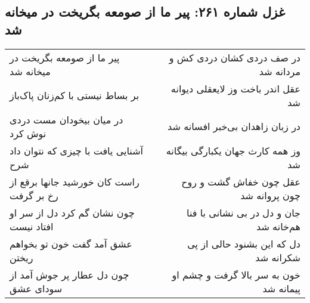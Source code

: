 \begin{center}
\section*{غزل شماره ۲۶۱: پیر ما از صومعه بگریخت در میخانه شد}
\label{sec:261}
\begin{longtable}{l p{0.5cm} r}
پیر ما از صومعه بگریخت در میخانه شد
&&
در صف دردی کشان دردی کش و مردانه شد
\\
بر بساط نیستی با کم‌زنان پاک‌باز
&&
عقل اندر باخت وز لایعقلی دیوانه شد
\\
در میان بیخودان مست دردی نوش کرد
&&
در زبان زاهدان بی‌خبر افسانه شد
\\
آشنایی یافت با چیزی که نتوان داد شرح
&&
وز همه کارث جهان یکبارگی بیگانه شد
\\
راست کان خورشید جانها برقع از رخ بر گرفت
&&
عقل چون خفاش گشت و روح چون پروانه شد
\\
چون نشان گم کرد دل از سر او افتاد نیست
&&
جان و دل در بی نشانی با فنا هم‌خانه شد
\\
عشق آمد گفت خون تو بخواهم ریختن
&&
دل که این بشنود حالی از پی شکرانه شد
\\
چون دل عطار پر جوش آمد از سودای عشق
&&
خون به سر بالا گرفت و چشم او پیمانه شد
\\
\end{longtable}
\end{center}
